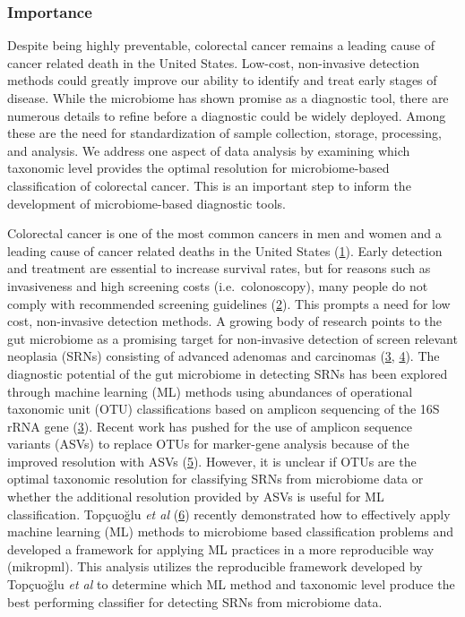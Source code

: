 \documentclass[
]{article}
\begin{document}
\hypertarget{importance}{%
\subsubsection{Importance}\label{importance}}

Despite being highly preventable, colorectal cancer remains a leading
cause of cancer related death in the United States. Low-cost,
non-invasive detection methods could greatly improve our ability to
identify and treat early stages of disease. While the microbiome has
shown promise as a diagnostic tool, there are numerous details to refine
before a diagnostic could be widely deployed. Among these are the need
for standardization of sample collection, storage, processing, and
analysis. We address one aspect of data analysis by examining which
taxonomic level provides the optimal resolution for microbiome-based
classification of colorectal cancer. This is an important step to inform
the development of microbiome-based diagnostic tools.

\newpage

Colorectal cancer is one of the most common cancers in men and women and
a leading cause of cancer related deaths in the United States
(\protect\hyperlink{ref-siegel2020}{1}). Early detection and treatment
are essential to increase survival rates, but for reasons such as
invasiveness and high screening costs (i.e.~colonoscopy), many people do
not comply with recommended screening guidelines
(\protect\hyperlink{ref-garcuxeda2011}{2}). This prompts a need for low
cost, non-invasive detection methods. A growing body of research points
to the gut microbiome as a promising target for non-invasive detection
of screen relevant neoplasia (SRNs) consisting of advanced adenomas and
carcinomas (\protect\hyperlink{ref-zackular2014}{3},
\protect\hyperlink{ref-zeller2014}{4}). The diagnostic potential of the
gut microbiome in detecting SRNs has been explored through machine
learning (ML) methods using abundances of operational taxonomic unit
(OTU) classifications based on amplicon sequencing of the 16S rRNA gene
(\protect\hyperlink{ref-zackular2014}{3}). Recent work has pushed for
the use of amplicon sequence variants (ASVs) to replace OTUs for
marker-gene analysis because of the improved resolution with ASVs
(\protect\hyperlink{ref-callahan2017}{5}). However, it is unclear if
OTUs are the optimal taxonomic resolution for classifying SRNs from
microbiome data or whether the additional resolution provided by ASVs is
useful for ML classification. Topçuoğlu \emph{et al}
(\protect\hyperlink{ref-topuxe7uolu2020}{6}) recently demonstrated how
to effectively apply machine learning (ML) methods to microbiome based
classification problems and developed a framework for applying ML
practices in a more reproducible way (mikropml). This analysis utilizes
the reproducible framework developed by Topçuoğlu \emph{et al} to
determine which ML method and taxonomic level produce the best
performing classifier for detecting SRNs from microbiome data.
\end{document}
